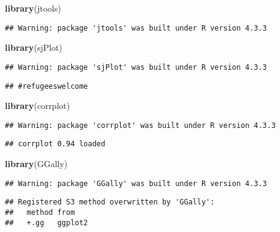 \documentclass[
]{article}
\newenvironment{Shaded}{\begin{snugshade}}{\end{snugshade}}
\newcommand{\FunctionTok}[1]{\textcolor[rgb]{0.13,0.29,0.53}{\textbf{#1}}}
\newcommand{\NormalTok}[1]{#1}
\begin{document}
\begin{Shaded}
\begin{Highlighting}[]
\FunctionTok{library}\NormalTok{(jtools)}
\end{Highlighting}
\end{Shaded}

\begin{verbatim}
## Warning: package 'jtools' was built under R version 4.3.3
\end{verbatim}

\begin{Shaded}
\begin{Highlighting}[]
\FunctionTok{library}\NormalTok{(sjPlot)}
\end{Highlighting}
\end{Shaded}

\begin{verbatim}
## Warning: package 'sjPlot' was built under R version 4.3.3
\end{verbatim}

\begin{verbatim}
## #refugeeswelcome
\end{verbatim}

\begin{Shaded}
\begin{Highlighting}[]
\FunctionTok{library}\NormalTok{(corrplot)}
\end{Highlighting}
\end{Shaded}

\begin{verbatim}
## Warning: package 'corrplot' was built under R version 4.3.3
\end{verbatim}

\begin{verbatim}
## corrplot 0.94 loaded
\end{verbatim}

\begin{Shaded}
\begin{Highlighting}[]
\FunctionTok{library}\NormalTok{(GGally)}
\end{Highlighting}
\end{Shaded}

\begin{verbatim}
## Warning: package 'GGally' was built under R version 4.3.3
\end{verbatim}

\begin{verbatim}
## Registered S3 method overwritten by 'GGally':
##   method from   
##   +.gg   ggplot2
\end{verbatim}
\end{document}
